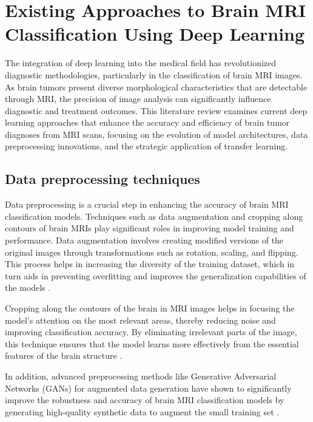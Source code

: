\section{Existing Approaches to Brain MRI Classification Using Deep Learning}\label{s:lit_review}


The integration of deep learning into the medical field has revolutionized diagnostic methodologies, particularly in the classification of brain MRI images. As brain tumors present diverse morphological characteristics that are detectable through MRI, the precision of image analysis can significantly influence diagnostic and treatment outcomes. This literature review examines current deep learning approaches that enhance the accuracy and efficiency of brain tumor diagnoses from MRI scans, focusing on the evolution of model architectures, data preprocessing innovations, and the strategic application of transfer learning.

\subsection{Data preprocessing techniques}

Data preprocessing is a crucial step in enhancing the accuracy of brain MRI classification models. Techniques such as data augmentation \cite{10183465} and cropping along contours of brain MRIs play significant roles in improving model training and performance. Data augmentation involves creating modified versions of the original images through transformations such as rotation, scaling, and flipping. This process helps in increasing the diversity of the training dataset, which in turn aids in preventing overfitting and improves the generalization capabilities of the models \cite{Paul2017Deep}.

Cropping along the contours of the brain in MRI images helps in focusing the model’s attention on the most relevant areas, thereby reducing noise and improving classification accuracy. By eliminating irrelevant parts of the image, this technique ensures that the model learns more effectively from the essential features of the brain structure \cite{Asif2022Improving}.

In addition, advanced preprocessing methods like Generative Adversarial Networks (GANs) for augmented data generation have shown to significantly improve the robustness and accuracy of brain MRI classification models by generating high-quality synthetic data to augment the small training set \cite{Fahimi2020Generative}.

